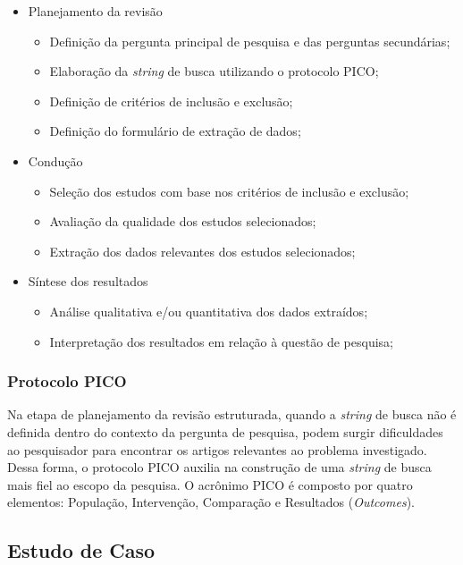 \begin{itemize}
    \item Planejamento da revisão
    \begin{itemize}
        \item Definição da pergunta principal de pesquisa e das perguntas secundárias;
        \item Elaboração da \textit{string} de busca utilizando o protocolo PICO;
        \item Definição de critérios de inclusão e exclusão;
        \item Definição do formulário de extração de dados;
    \end{itemize}
    \item Condução
    \begin{itemize}
        \item Seleção dos estudos com base nos critérios de inclusão e exclusão;
        \item Avaliação da qualidade dos estudos selecionados;
        \item Extração dos dados relevantes dos estudos selecionados;
    \end{itemize}
    \item Síntese dos resultados
    \begin{itemize}
        \item Análise qualitativa e/ou quantitativa dos dados extraídos;
        \item Interpretação dos resultados em relação à questão de pesquisa;
    \end{itemize}
\end{itemize}


\subsubsection{Protocolo PICO}

Na etapa de planejamento da revisão estruturada, quando a \textit{string} de busca não é definida dentro do contexto da pergunta de pesquisa, podem surgir dificuldades ao pesquisador para encontrar os artigos relevantes ao problema investigado. Dessa forma, o protocolo PICO auxilia na construção de uma \textit{string} de busca mais fiel ao escopo da pesquisa. O acrônimo PICO é composto por quatro elementos: População, Intervenção, Comparação e Resultados (\textit{Outcomes}). \cite{pai2004systematic}

\subsection{Estudo de Caso}

